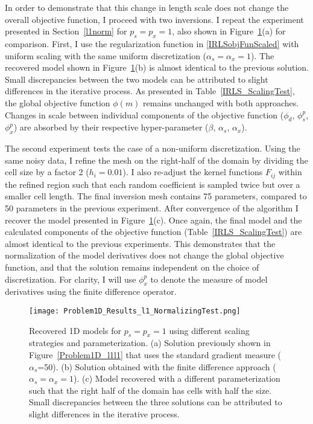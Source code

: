 In order to demonstrate that this change in length scale does not change the overall objective function, I proceed with two inversions. I repeat the experiment presented in Section~\ref{l1norm} for $p_s=p_x=1$, also shown in Figure~\ref{Mixed1D_p1_normalizedTest}(a) for comparison. First, I use the regularization function in \eqref{IRLSobjFunScaled} with uniform scaling with the same uniform discretization ($\alpha_s=\alpha_x=1$). The recovered model shown in Figure~\ref{Mixed1D_p1_normalizedTest}(b) is almost identical to the previous solution. Small discrepancies between the two models can be attributed to slight differences in the iterative process. As presented in Table~\ref{IRLS_ScalingTest}, the global objective function $\phi(m)$ remains unchanged with both approaches. Changes in scale between individual components of the objective function ($\phi_d$, $\phi^p_s$, $\phi^p_x$) are absorbed by their respective hyper-parameter ($\beta$, $\alpha_s$, $\alpha_x$).

The second experiment tests the case of a non-uniform discretization. Using the same noisy data, I refine the mesh on the right-half of the domain by dividing the cell size by a factor 2 ($h_i = 0.01$). I also re-adjust the kernel functions ${F}_{ij}$ within the refined region such that each random coefficient is sampled twice but over a smaller cell length. The final inversion mesh contains 75 parameters, compared to 50 parameters in the previous experiment. After convergence of the algorithm I recover the model presented in Figure~\ref{Mixed1D_p1_normalizedTest}(c). Once again, the final model and the calculated components of the objective function (Table~\ref{IRLS_ScalingTest}) are almost identical to the previous experiments. This demonstrates that the normalization of the model derivatives does not change the global objective function, and that the solution remains independent on the choice of discretization.   
For clarity, I will use $\phi_x^p$ to denote the measure of model derivatives using the finite difference operator.
\begin{figure}
\texttt{[image: Problem1D\_Results\_l1\_NormalizingTest.png]}
\caption{Recovered 1D models for $p_s=p_x=1$ using different scaling strategies and parameterization. (a) Solution previously shown in Figure~\ref{Problem1D_l1l1} that uses the standard gradient measure ($\alpha_s$=50). (b) Solution obtained with the finite difference approach ($\alpha_s=\alpha_x=1$). (c) Model recovered with a different parameterization such that the right half of the domain has cells with half the size. Small discrepancies between the three solutions can be attributed to slight differences in the iterative process.   
}
\label{Mixed1D_p1_normalizedTest}
\end{figure}

